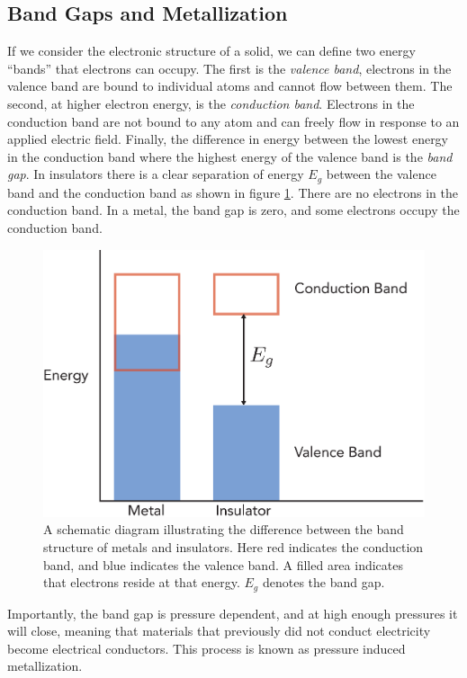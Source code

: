 \subsection{Band Gaps and Metallization}
If we consider the electronic structure of a solid, we can define two energy ``bands'' that electrons can occupy. The first is the \emph{valence band}, electrons in the valence band are bound to individual atoms and cannot flow between them. The second, at higher electron energy, is the \emph{conduction band}. Electrons in the conduction band are not bound to any atom and can freely flow in response to an applied electric field. Finally, the difference in energy between the lowest energy in the conduction band where the highest energy of the valence band is the \emph{band gap}. In insulators there is a clear separation of energy $E_g$ between the valence band and the conduction band as shown in figure \ref{fig:bandgap}. There are no electrons in the conduction band. In a metal, the band gap is zero, and some electrons occupy the conduction band.
\begin{figure}
	\centering
        \includegraphics[width=.6\textwidth]{Chapter3/Figures/EnergyGap.eps}
        \caption{A schematic diagram illustrating the difference between the band structure of metals and insulators. Here red indicates the conduction band, and blue indicates the valence band. A filled area indicates that electrons reside at that energy. $E_g$ denotes the band gap.}
        \label{fig:bandgap}
\end{figure}
Importantly, the band gap is pressure dependent, and at high enough pressures it will close, meaning that materials that previously did not conduct electricity become electrical conductors. This process is known as pressure induced metallization.

